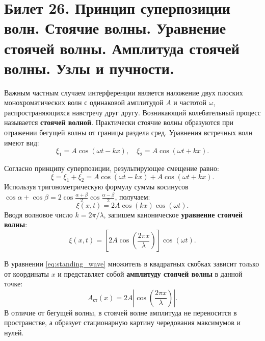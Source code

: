 \section{Билет 26. Принцип суперпозиции волн. Стоячие волны. Уравнение стоячей волны. Амплитуда стоячей волны. Узлы и пучности.}

\begin{definition}
Важным частным случаем интерференции является наложение двух плоских монохроматических волн с одинаковой амплитудой $A$ и частотой $\omega$, распространяющихся навстречу друг другу. Возникающий колебательный процесс называется \textbf{стоячей волной}. Практически стоячие волны образуются при отражении бегущей волны от границы раздела сред.
Уравнения встречных волн имеют вид:
\begin{equation}
    \xi_1 = A \cos(\omega t - kx), \quad \xi_2 = A \cos(\omega t + kx).
\end{equation}
\end{definition}

\begin{theorem}
Согласно принципу суперпозиции, результирующее смещение равно:
\begin{equation}
    \xi = \xi_1 + \xi_2 = A \cos(\omega t - kx) + A \cos(\omega t + kx).
\end{equation}
Используя тригонометрическую формулу суммы косинусов $\cos\alpha + \cos\beta = 2\cos\frac{\alpha+\beta}{2}\cos\frac{\alpha-\beta}{2}$, получаем:
\begin{equation}
    \xi(x,t) = 2A \cos(kx) \cos(\omega t). \label{eq:standing_wave}
\end{equation}
Вводя волновое число $k = 2\pi/\lambda$, запишем каноническое \textbf{уравнение стоячей волны}:
\begin{equation}
    \xi(x,t) = \left[ 2A \cos\left(\frac{2\pi x}{\lambda}\right) \right] \cos(\omega t).
\end{equation}
\end{theorem}

\begin{definition}
В уравнении \eqref{eq:standing_wave} множитель в квадратных скобках зависит только от координаты $x$ и представляет собой \textbf{амплитуду стоячей волны} в данной точке:
\begin{equation}
    A_{\text{ст}}(x) = 2A \left| \cos\left(\frac{2\pi x}{\lambda}\right) \right|. \label{eq:standing_amp}
\end{equation}
В отличие от бегущей волны, в стоячей волне амплитуда не переносится в пространстве, а образует стационарную картину чередования максимумов и нулей.
\end{definition}

